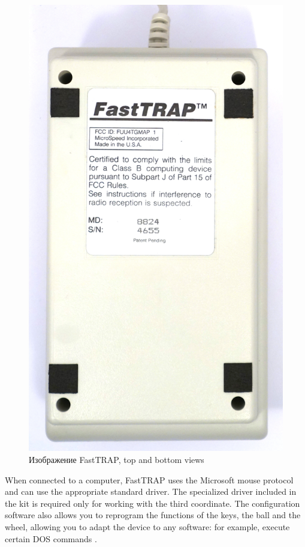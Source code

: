 \documentclass[11pt, a4paper]{article}
\begin{document}
\begin{figure}[h]
    \includegraphics[scale=0.3]{1987_microspeed_fasttrap/bottom_60.jpg}
    \caption{Изображение FastTRAP, top and bottom views}
    \label{fig:FastTRAPTop}
\end{figure}

When connected to a computer, FastTRAP uses the Microsoft mouse protocol and can use the appropriate standard driver. The specialized driver included in the kit is required only for working with the third coordinate. The configuration software also allows you to reprogram the functions of the keys, the ball and the wheel, allowing you to adapt the device to any software: for example, execute certain DOS commands  \cite{fast}.
\end{document}
